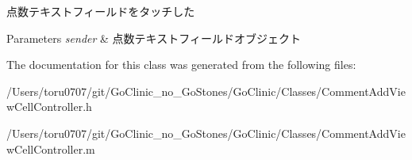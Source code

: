 \label{interface_comment_add_view_cell_controller_a513ed5171ca3b8ff13b6fff41d16882c}
点数テキストフィールドをタッチした 
\begin{DoxyParams}{Parameters}
{\em sender} & 点数テキストフィールドオブジェクト \\
\hline
\end{DoxyParams}


The documentation for this class was generated from the following files:\begin{DoxyCompactItemize}
\item 
/Users/toru0707/git/GoClinic\_\-no\_\-GoStones/GoClinic/Classes/CommentAddViewCellController.h\item 
/Users/toru0707/git/GoClinic\_\-no\_\-GoStones/GoClinic/Classes/CommentAddViewCellController.m\end{DoxyCompactItemize}
